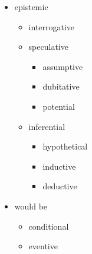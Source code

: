 \begin{table}
\begin{itemize}
\begin{itemize}
\begin{itemize}
        \end{itemize}
    
    \item epistemic
        \begin{itemize}
            \item interrogative
            \item speculative
                \begin{itemize}
                    \item assumptive
                    \item dubitative
                    \item potential
                \end{itemize}
            
            \item inferential
                \begin{itemize}
                    \item hypothetical
                    \item inductive
                    \item deductive
                \end{itemize}
            
        \end{itemize}
    
    \item would be
        \begin{itemize}
            \item conditional
            \item eventive
        \end{itemize}
    \end{itemize}
\end{itemize}
\label{moodTree}
\end{table}
